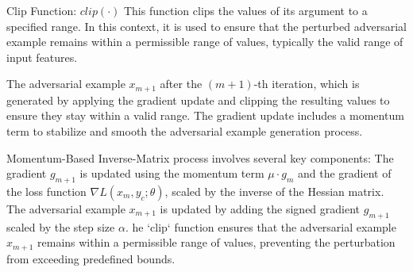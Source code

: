 Clip Function: ${clip}(\cdot)$ This function clips the values of its argument to a specified range. In this context, it is used to ensure that the perturbed adversarial example remains within a permissible range of values, typically the valid range of input features.


The adversarial example \(x_{m+1}\) after the \((m+1)\)-th iteration, which is generated by applying the gradient update and clipping the resulting values to ensure they stay within a valid range. The gradient update includes a momentum term to stabilize and smooth the adversarial example generation process.

Momentum-Based Inverse-Matrix process involves several key components:
The gradient \(g_{m+1}\) is updated using the momentum term \(\mu \cdot g_m\) and the gradient of the loss function \(\nabla L(x_m, y_c; \theta)\), scaled by the inverse of the Hessian matrix.
The adversarial example \(x_{m+1}\) is updated by adding the signed gradient \(g_{m+1}\) scaled by the step size \(\alpha\).
he `clip` function ensures that the adversarial example \(x_{m+1}\) remains within a permissible range of values, preventing the perturbation from exceeding predefined bounds.
